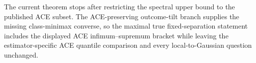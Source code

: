 The current theorem stops after restricting the spectral upper bound to the published ACE subset. The ACE-preserving outcome-tilt branch supplies the missing class-minimax converse, so the maximal true fixed-separation statement includes the displayed ACE infimum--supremum bracket while leaving the estimator-specific ACE quantile comparison and every local-to-Gaussian question unchanged.